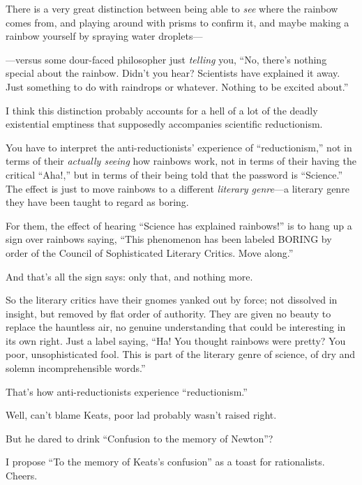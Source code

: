 {
 There is a very great distinction between being able to
\textit{see} where the rainbow comes from, and playing around with
prisms to confirm it, and maybe making a rainbow yourself by spraying
water droplets---}

{
 {}---versus some dour-faced philosopher just \textit{telling} you,
``No, there's nothing special about
the rainbow. Didn't you hear? Scientists have explained
it away. Just something to do with raindrops or whatever. Nothing to be
excited about.''}

{
 I think this distinction probably accounts for a hell of a lot of
the deadly existential emptiness that supposedly accompanies scientific
reductionism.}

{
 You have to interpret the anti-reductionists'
experience of ``reductionism,'' not
in terms of their \textit{actually seeing} how rainbows work, not in
terms of their having the critical
``Aha!,'' but in terms of their
being told that the password is
``Science.'' The effect is just to
move rainbows to a different \textit{literary genre}{}---a literary
genre they have been taught to regard as boring.}

{
 For them, the effect of hearing ``Science has
explained rainbows!'' is to hang up a sign over
rainbows saying, ``This phenomenon has been labeled
BORING by order of the Council of Sophisticated Literary Critics. Move
along.''}

{
 And that's all the sign says: only that, and
nothing more.}

{
 So the literary critics have their gnomes yanked out by force; not
dissolved in insight, but removed by flat order of authority. They are
given no beauty to replace the hauntless air, no genuine understanding
that could be interesting in its own right. Just a label saying,
``Ha! You thought rainbows were pretty? You poor,
unsophisticated fool. This is part of the literary genre of science, of
dry and solemn incomprehensible words.''}

{
 That's how anti-reductionists experience
``reductionism.''}

{
 Well, can't blame Keats, poor lad probably
wasn't raised right.}

{
 But he dared to drink ``Confusion to the memory
of Newton''?}

{
 I propose ``To the memory of
Keats's confusion'' as a toast for
rationalists. Cheers.}

\myendsectiontext


